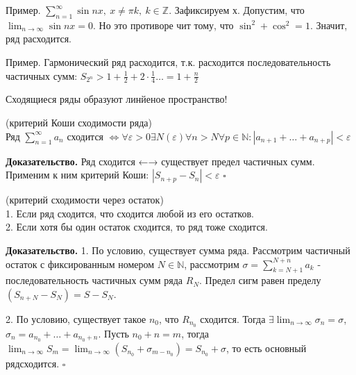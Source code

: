 Пример. $\sum_{n=1}^{\infty} \sin{nx},~x\ne\pi k,~k \in\mathbb{Z}$. 
Зафиксируем х. Допустим, что $\lim_{n \to \infty}\sin nx=0 $. Но это противоре
чит тому, что $\sin^2+\cos^2=1$. Значит, ряд расходится.

Пример. Гармонический ряд расходится, т.к. расходится последовательность 
частичных сумм: $S_{2^n}>1+\frac{1}{2}+2\cdot \frac{1}{4}\ldots=1+\frac{n}{2}$

Сходящиеся ряды образуют линйеное пространство!
\begin{theor}
    (критерий Коши сходимости ряда)\\ Ряд $\sum_{n=1}^{\infty} a_n$ сходится 
    $\iff\forall \varepsilon>0\exists N(\varepsilon) \forall n>N \forall p\in\mathbb{N}:|a_{n+1}+\ldots+a_{n+p}|<\varepsilon$
\end{theor}
\textbf{Доказательство.} Ряд сходится ←→ существует предел частичных
сумм. Применим к ним критерий Коши: $|S_{n+p}-S_n|<\varepsilon$
$\square$ 
\begin{theor}
    (критерий сходимости через остаток)\\1. Если ряд сходится, что сходится
    любой из его остатков.\\2. Если хотя бы один остаток сходится, то ряд
    тоже сходится.
\end{theor}
\textbf{Доказательство.} 1. По условию, существует сумма ряда. Рассмотрим
частичный остаток с фиксированным номером $N\in\mathbb{N}$, рассмотрим 
$\sigma=\sum_{k=N+1}^{N+n} a_k$ - последовательность частичных сумм ряда $R_N$.
Предел сигм равен пределу  $(S_{n+N}-S_N)=S-S_N$.

2. По условию, существует такое $n_0$, что  $R_{n_0}$ сходится. Тогда
$\exists \lim_{n \to \infty}\sigma_n=\sigma$, 
$\sigma_n=a_{n_0}+\ldots+a_{n_0+n}$. Пусть $n_0+n=m$, тогда
$\lim_{n \to \infty}S_m=\lim_{n \to \infty} (S_{n_0}+\sigma_{m-n_0})=
S_{n_0}+\sigma$, то есть основный рядсходится.
$\square$ 





